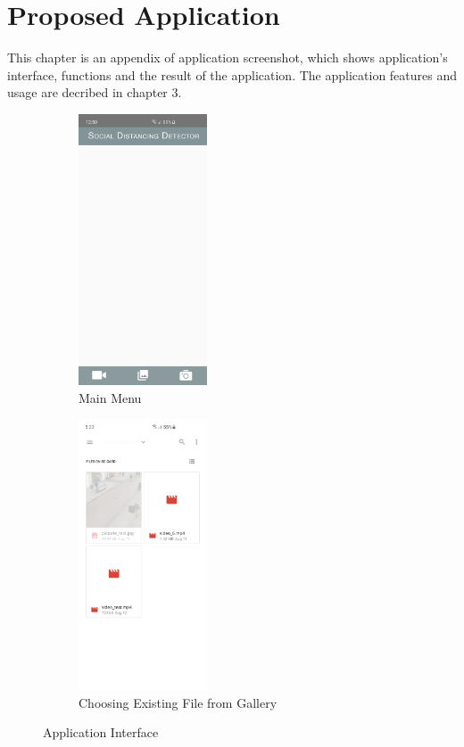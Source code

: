 \chapter{Proposed Application}\label{intro}

    This chapter is an appendix of application screenshot,
    which shows application's interface, functions and the result of the application.
    The application features and usage are decribed in chapter 3.

    \begin{figure}[h!]
        \centering
        \begin{subfigure}{.5\textwidth}
        \centering
        \includegraphics[width=1.5in]{images/appendix-b/sh-main.jpg}
        \caption{Main Menu}
        \label{appendix-b:mainMenu}
        \end{subfigure}%
        \begin{subfigure}{.5\textwidth}
        \centering
        \includegraphics[width=1.5in]{images/appendix-b/sh-choosing.jpg}
        \caption{Choosing Existing File from Gallery}
        \label{appendix-b:filePicker}
        \end{subfigure}
        \caption{Application Interface}
        \label{appendix-b:menu}
    \end{figure}

